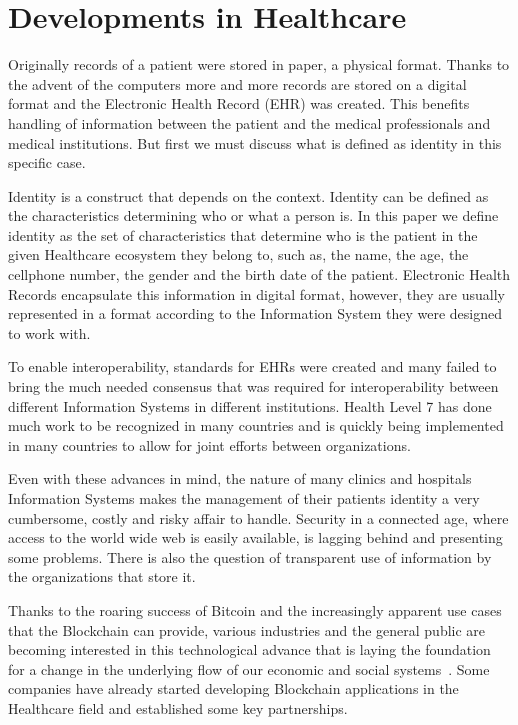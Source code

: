 \section{Developments in Healthcare}\label{blockchainHealthcare}

Originally records of a patient were stored in paper, a physical format.
Thanks to the advent of the computers more and more records are stored on a
digital format and the Electronic Health Record (EHR) was created.
\cite{Marquez2017}  This benefits handling of information between the patient
and the medical professionals and medical institutions.\cite{ONCoordinator2017}
But first we must discuss what is defined as identity in this specific case.

Identity is a construct that depends on the context.  Identity can be defined
as the characteristics determining who or what a person is.  In this paper we
define identity as the set of characteristics that determine who is the patient
in the given Healthcare ecosystem they belong to, such as, the name, the age,
the cellphone number, the gender and the birth date of the patient.  Electronic
Health Records encapsulate this information in digital format, however, they
are usually represented in a format according to the Information System they
were designed to work with.

To enable interoperability, standards for EHRs were created and many failed to
bring the much needed consensus that was required for interoperability between
different Information Systems in different institutions.  \cite{Eichelberg2006}
Health Level 7 has done much work to be recognized in many countries and is
quickly being implemented in many countries to allow for joint efforts between
organizations. \cite{HL7Anual2016}

Even with these advances in mind, the nature of many clinics and hospitals
Information Systems makes the management of their patients identity a very
cumbersome, costly and risky affair to handle.  Security in a connected age,
where access to the world wide web is easily available, is lagging behind and
presenting some problems.  There is also the question of transparent use of
information by the organizations that store it.

Thanks to the roaring success of Bitcoin and the increasingly apparent use
cases that the Blockchain can provide, various industries and the general
public are becoming interested in this technological advance that is laying the
foundation for a change in the underlying flow of our economic and social
systems~\cite{Zago2018,	Marr2018,Long2018}. Some companies have already started
developing Blockchain applications in the Healthcare field and established some
key partnerships.


